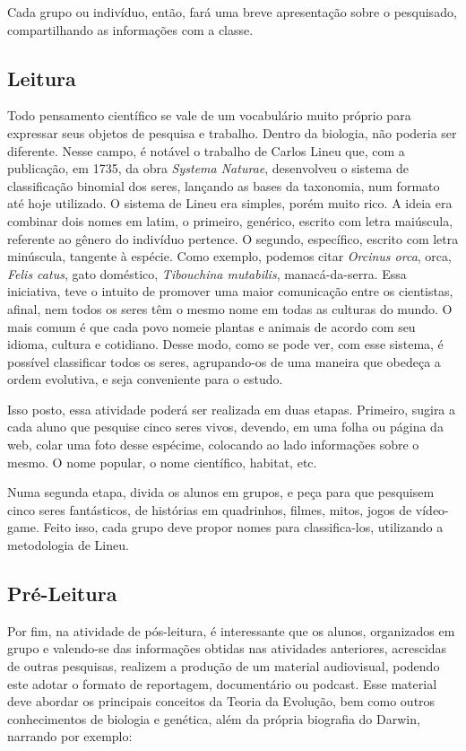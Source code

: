 \documentclass[12pt]{extarticle}
\begin{document}
Cada grupo ou indivíduo, então, fará uma breve apresentação sobre o pesquisado,
compartilhando as informações com a classe.

\subsection{Leitura}


Todo pensamento científico se vale de um vocabulário muito próprio para
expressar seus objetos de pesquisa e trabalho. Dentro da biologia, não poderia
ser diferente. Nesse campo, é notável o trabalho de Carlos Lineu que, com
a publicação, em 1735, da obra \emph{Systema Naturae}, desenvolveu o sistema de
classificação binomial dos seres, lançando as bases da taxonomia, num formato
até hoje utilizado. O sistema de Lineu era simples, porém muito rico. A ideia
era combinar dois nomes em latim, o primeiro, genérico, escrito com letra
maiúscula, referente ao gênero do indivíduo pertence. O segundo, específico,
escrito com letra minúscula, tangente à espécie. Como exemplo, podemos citar
\emph{Orcinus orca}, orca, \emph{Felis catus}, gato doméstico, \emph{Tibouchina
mutabilis}, manacá-da-serra. Essa iniciativa, teve o intuito de promover uma
maior comunicação entre os cientistas, afinal, nem todos os seres têm o mesmo
nome em todas as culturas do mundo. O mais comum é que cada povo nomeie plantas
e animais de acordo com seu idioma, cultura e cotidiano. Desse modo, como se
pode ver, com esse sistema, é possível classificar todos os seres, agrupando-os
de uma maneira que obedeça a ordem evolutiva, e seja conveniente para o estudo.

Isso posto, essa atividade poderá ser realizada em duas etapas.  Primeiro,
sugira a cada aluno que pesquise cinco seres vivos, devendo, em uma folha ou
página da web, colar uma foto desse espécime, colocando ao lado informações
sobre o mesmo. O nome popular, o nome científico, habitat, etc.

Numa segunda etapa, divida os alunos em grupos, e peça para que pesquisem cinco
seres fantásticos, de histórias em quadrinhos, filmes, mitos, jogos de
vídeo-game. Feito isso, cada grupo deve propor nomes para classifica-los,
utilizando a metodologia de Lineu.

\subsection{Pré-Leitura}

Por fim, na atividade de pós-leitura, é interessante que os alunos, organizados
em grupo e valendo-se das informações obtidas nas atividades anteriores,
acrescidas de outras pesquisas, realizem a produção de um material audiovisual,
podendo este adotar o formato de reportagem, documentário ou podcast. Esse
material deve abordar os principais conceitos da Teoria da Evolução, bem como
outros conhecimentos de biologia e genética, além da própria biografia do
Darwin, narrando por exemplo:
\end{document}
